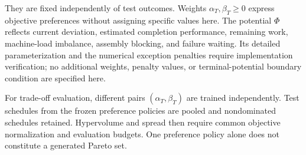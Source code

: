 They are fixed independently of test outcomes. Weights $\alpha_T,\beta_T\ge0$ express objective
preferences without assigning specific values here. The potential $\Phi$ reflects current deviation,
estimated completion performance, remaining work, machine-load imbalance, assembly blocking,
and failure waiting. Its detailed parameterization and the numerical exception penalties require
implementation verification; no additional weights, penalty values, or terminal-potential boundary
condition are specified here.


For trade-off evaluation, different pairs $(\alpha_T,\beta_T)$ are trained independently.
Test schedules from the frozen preference policies are pooled and nondominated schedules retained.
Hypervolume and spread then require common objective normalization and evaluation budgets.
One preference policy alone does not constitute a generated Pareto set.



